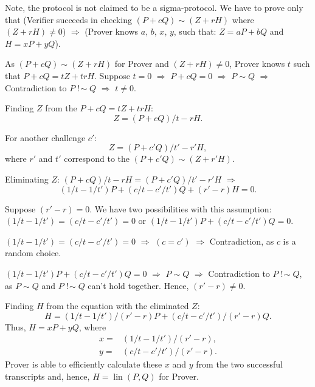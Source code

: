\documentclass{mathcryptology} %
\DeclareMathOperator{\notsim}{!\!\sim}
\DeclareMathOperator{\lin}{lin}
\theoremstyle{title}
\theoremstyle{titleof}
\renewenvironment{proof}{\noindent{\bfseries Proof:} }{}
\begin{document}
    \begin{proof}
        Note, the protocol is not claimed to be a sigma-protocol. We have to prove only that (Verifier succeeds in checking $\left(P+cQ\right) \sim \left(Z+rH\right)$ where $(Z+rH)\neq 0$) $\Rightarrow$ (Prover knows $a$, $b$, $x$, $y$, such that: $Z=aP+bQ$ and $H=xP+yQ$).

        As $\left(P+cQ\right) \sim \left(Z+rH\right)$ for Prover and $(Z+rH)\neq 0$, Prover knows $t$ such that $P+cQ=tZ+trH$. 
        Suppose $t=0$ $\Rightarrow$ $P+cQ=0$ $\Rightarrow$ $P\sim Q$ $\Rightarrow$ Contradiction to $P\notsim Q$ $\Rightarrow$ $t\neq0$.

        Finding $Z$ from the $P+cQ=tZ+trH$:
        \begin{equation*}
            Z=\left(P+cQ\right)/t-rH.
        \end{equation*}

        For another challenge $c'$: 
        \begin{equation*}
            Z=\left(P+c'Q\right)/t' - r'H,
        \end{equation*}
        where $r'$ and $t'$ correspond to the $\left(P+c'Q\right)\sim \left(Z+r'H\right)$.

        Eliminating $Z$: $\left(P+cQ\right)/t-rH=\left(P+c'Q\right)/t' - r'H$ $\Rightarrow$ 
        \begin{equation*}
            \left(1/t-1/t'\right)P+\left(c/t-c'/t'\right)Q+\left(r' - r\right)H=0.
        \end{equation*}        

        Suppose $\left(r' - r\right)=0$. We have two possibilities with this assumption: $\left(1/t-1/t'\right)=\left(c/t-c'/t'\right)=0$ or $\left(1/t-1/t'\right)P+\left(c/t-c'/t'\right)Q=0$.

        $\left(1/t-1/t'\right)=\left(c/t-c'/t'\right)=0$ $\Rightarrow$ $\left(c=c'\right)$ $\Rightarrow$ Contradiction, as $c$ is a random choice.

        $\left(1/t-1/t'\right)P+\left(c/t-c'/t'\right)Q=0$ $\Rightarrow$ $P\sim Q$ $\Rightarrow$ Contradiction to $P\notsim Q$, as $P\sim Q$ and $P\notsim Q$ can't hold together. Hence, $\left(r' - r\right)\neq0$.

        Finding $H$ from the equation with the eliminated $Z$:
        \begin{equation*}
            H=\left(1/t-1/t'\right)/\left(r' - r\right)P+\left(c/t-c'/t'\right)/\left(r' - r\right)Q.
        \end{equation*}         
        Thus, $H=xP+yQ$, where
        \begin{align*}
            x= & \left(1/t-1/t'\right)/\left(r' - r\right),\\ 
            y= & \left(c/t-c'/t'\right)/\left(r' - r\right).        
        \end{align*}
        Prover is able to efficiently calculate these $x$ and $y$ from the two successful transcripts and, hence, $H=\lin\left(P, Q\right)$ for Prover.
        

\end{proof}
\end{document}
